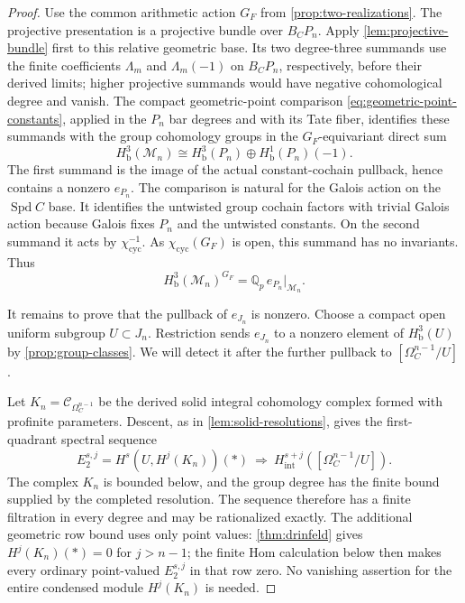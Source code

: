 \documentclass[11pt]{article}
\numberwithin{equation}{section}
\theoremstyle{definition}
\theoremstyle{remark}
\begin{document}
\begin{proof}
Use the common arithmetic action $G_F$ from
\cref{prop:two-realizations}.
The projective presentation is a projective bundle over $B_CP_n$.
Apply \cref{lem:projective-bundle} first to this relative geometric
base.  Its two degree-three summands use the finite coefficients
$\Lambda_m$ and $\Lambda_m(-1)$ on $B_CP_n$, respectively, before
their derived limits; higher projective summands would have negative
cohomological degree and vanish.  The compact geometric-point comparison
\eqref{eq:geometric-point-constants}, applied in the $P_n$ bar degrees
and with its Tate fiber, identifies these summands with the group
cohomology groups in the $G_F$-equivariant direct sum
\begin{equation}\label{eq:projective-degree-three}
 H^3_{\mathrm b}(\mathcal M_n)
 \cong H^3_{\mathrm b}(P_n)
          \oplus H^1_{\mathrm b}(P_n)(-1).
\end{equation}
The first summand is the image of the actual constant-cochain pullback,
hence contains a nonzero $e_{P_n}$.  The comparison is natural for the
Galois action on the $\operatorname{Spd} C$ base.  It identifies the untwisted group
cochain factors with trivial Galois action because Galois fixes $P_n$
and the untwisted constants.
On the second summand it acts by $\chi_{\mathrm{cyc}}^{-1}$.
As $\chi_{\mathrm{cyc}}(G_F)$ is open, this summand has no invariants.
Thus
\begin{equation}\label{eq:invariant-line}
 H^3_{\mathrm b}(\mathcal M_n)^{G_F}
       =\mathbb Q_p\,e_{P_n}|_{\mathcal M_n}.
\end{equation}

It remains to prove that the pullback of $e_{J_n}$ is nonzero.
Choose a compact open uniform subgroup $U\subset J_n$.
Restriction sends $e_{J_n}$ to a nonzero element of
$H^3_{\mathrm b}(U)$ by \cref{prop:group-classes}.
We will detect it after the further pullback to $[\Omega_C^{n-1}/U]$.

Let $K_n=\mathscr C_{\Omega_C^{n-1}}$ be the derived solid integral
cohomology complex formed with profinite parameters.
Descent, as in \cref{lem:solid-resolutions}, gives the first-quadrant
spectral sequence
\begin{equation}\label{eq:drinfeld-descent}
 E_2^{s,j}=H^s(U,H^j(K_n))(*)
 \ \Longrightarrow\
 H_{\mathrm{int}}^{s+j}([\Omega_C^{n-1}/U]).
\end{equation}
The complex $K_n$ is bounded below, and the group degree has the finite
bound supplied by the completed resolution.  The sequence therefore
has a finite filtration in every degree and may be rationalized
exactly.  The additional geometric row bound uses only point values:
\cref{thm:drinfeld} gives $H^j(K_n)(*)=0$ for $j>n-1$;
the finite Hom calculation below then makes every ordinary
point-valued $E_2^{s,j}$ in that row zero.  No vanishing assertion for
the entire condensed module $H^j(K_n)$ is needed.


\end{proof}
\end{document}
